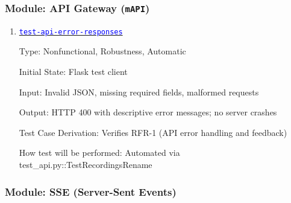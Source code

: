 \documentclass[12pt, titlepage]{article}
\newcommand{\mref}[1]{\texttt{#1}}
\newcommand{\tid}[1]{\hyperlink{tid:#1}{\textcolor{blue}{\texttt{#1}}}}
\begin{document}
\subsubsection{Module: API Gateway (\mref{mAPI})}

\begin{enumerate}

  \item{\tid{test-api-error-responses}\\}

        Type: Nonfunctional, Robustness, Automatic

        Initial State: Flask test client

        Input: Invalid JSON, missing required fields, malformed requests

        Output: HTTP 400 with descriptive error messages; no server crashes

        Test Case Derivation: Verifies RFR-1 (API error handling and feedback)

        How test will be performed: Automated via test\_api.py::TestRecordingsRename

\end{enumerate}

\subsubsection{Module: SSE (Server-Sent Events)}
\end{document}
